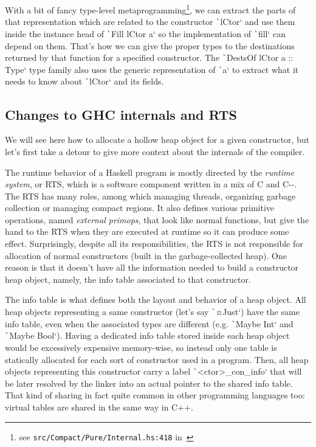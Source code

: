 \documentclass[english]{jflart}
\begin{document}
With a bit of fancy type-level metaprogramming\footnote{see \texttt{src/Compact/Pure/Internal.hs:418} in~\cite{linear_dest}}, we can extract the parts of that representation which are related to the constructor \texttt`lCtor` and use them inside the instance head of \texttt`Fill lCtor a` so the implementation of \texttt`fill` can depend on them. That's how we can give the proper types to the destinations returned by that function for a specified constructor. The \texttt`DestsOf lCtor a :: Type` type family also uses the generic representation of \texttt`a` to extract what it needs to know about \texttt`lCtor` and its fields.

\subsection{Changes to GHC internals and RTS}\label{ssec:impl-ghc}

We will see here how to allocate a hollow heap object for a given constructor, but let's first take a detour to give more context about the internals of the compiler.

The runtime behavior of a Haskell program is mostly directed by the \emph{runtime system}, or RTS, which is a software component written in a mix of C and C-{}-. The RTS has many roles, among which managing threads, organizing garbage collection or managing compact regions. It also defines various primitive operations, named \emph{external primops}, that look like normal functions, but give the hand to the RTS when they are executed at runtime so it can produce some effect. Surprisingly, despite all its responsibilities, the RTS is not responsible for allocation of normal constructors (built in the garbage-collected heap). One reason is that it doesn't have all the information needed to build a constructor heap object, namely, the info table associated to that constructor.

The info table is what defines both the layout and behavior of a heap object. All heap objects representing a same constructor (let's say \texttt`¤Just`) have the same info table, even when the associated types are different (e.g. \texttt`Maybe Int` and \texttt`Maybe Bool`). Having a dedicated info table stored inside each heap object would be excessively expensive memory-wise, so instead only one table is statically allocated for each sort of constructor used in a program. Then, all heap objects representing this constructor carry a label \texttt`<ctor>_con_info` that will be later resolved by the linker into an actual pointer to the shared info table. That kind of sharing in fact quite common in other programming languages too: virtual tables are shared in the same way in C++.
\end{document}
